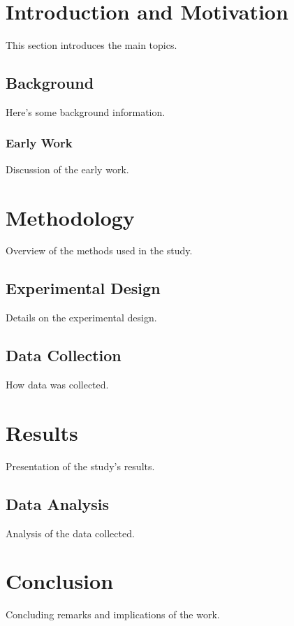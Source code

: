 \documentclass{article}
\begin{document}
\tableofcontents
\newpage

\section{Introduction and Motivation}
This section introduces the main topics.

\subsection{Background}
Here's some background information.

\subsubsection{Early Work}
Discussion of the early work.

\section{Methodology}
Overview of the methods used in the study.

\subsection{Experimental Design}
Details on the experimental design.

\subsection{Data Collection}
How data was collected.

\section{Results}
Presentation of the study's results.

\subsection{Data Analysis}
Analysis of the data collected.

\section{Conclusion}
Concluding remarks and implications of the work.
\end{document}

